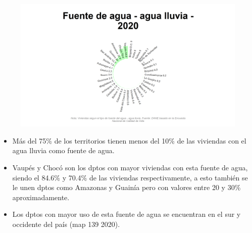     \begin{figure}[H]
        \caption[Agua lluvia como fuentes de agua por departamentos para 2020 ]{\label{agua_lluvia_dptos} }
        \begin{center}
        \includegraphics[width=\textwidth,keepaspectratio]{img/var_139_static.png}
        \end{center}
    \end{figure}
            \begin{itemize}
                    \item Más del 75\% de los territorios tienen menos del 10\% de las viviendas con el agua lluvia como fuente de agua.
                    \item Vaupés y Chocó son los dptos con mayor viviendas con esta fuente de agua, siendo el 84.6\% y 70.4\% de las viviendas respectivamente, a esto también se le unen dptos como Amazonas y Guainía pero con valores entre 20 y 30\% aproximadamente.
                    \item Los dptos con mayor uso de esta fuente de agua se encuentran en el sur y occidente del país (map 139 2020).
                    \end{itemize}


